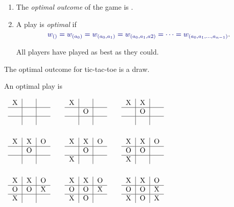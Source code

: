 \documentclass%
[%
Screen4to3,
]{foils}
\begin{document}


  \begin{enumerate}
\item[\grey{1.}] The \emph{optimal outcome} of the game is
.


\item[\grey{2.}] A play  is \emph{optimal} if
\[
\darkblue{w_{()} = w_{(a_0)} = w_{(a_0,a_1)} = w_{(a_0,a_1,a2)} = \cdots = w_{(a_0,a_1,\dots,a_{n-1})}}.
\]

All players have played as best as they could.
\end{enumerate}


\newcommand{\play}[9]{\text{%
\begin{tabular}{c|c|c}
$#1$ & $#2$ & $#3$ \\ \hline
$#4$ & $#5$ & $#6$ \\ \hline
$#7$ & $#8$ & $#9$
\end{tabular}%
}%
}

\newcommand{\X}{\text{X}}
\renewcommand{\O}{\text{O}}
\newcommand{\n}{\phantom{\O}}


The optimal outcome for tic-tac-toe is a draw.

An optimal play is


$
\begin{array}{ccc}
\play{\X}{\n}{\n}{\n}{\n}{\n}{\n}{\n}{\n} & \quad
\play{\X}{\n}{\n}{\n}{\O}{\n}{\n}{\n}{\n} & \quad
\play{\X}{\X}{\n}{\n}{\O}{\n}{\n}{\n}{\n} \\[7ex]

\play{\X}{\X}{\O}{\n}{\O}{\n}{\n}{\n}{\n} & \quad
\play{\X}{\X}{\O}{\n}{\O}{\n}{\X}{\n}{\n} & \quad
\play{\X}{\X}{\O}{\O}{\O}{\n}{\X}{\n}{\n} \\[7ex]

\play{\X}{\X}{\O}{\O}{\O}{\X}{\X}{\n}{\n} & \quad
\play{\X}{\X}{\O}{\O}{\O}{\X}{\X}{\O}{\n} & \quad
\play{\X}{\X}{\O}{\O}{\O}{\X}{\X}{\O}{\X}
\end{array}
$

\end{document}

